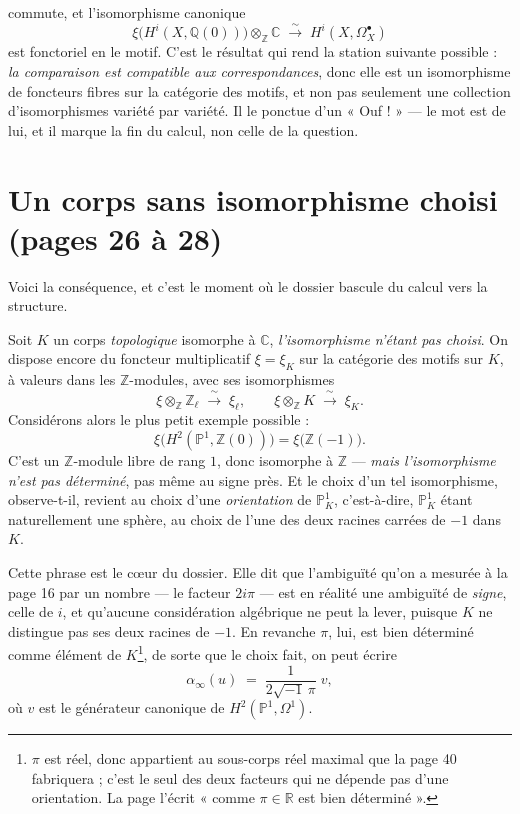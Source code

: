 \documentclass[11pt,a4paper]{article}
\begin{document}

commute, et l'isomorphisme canonique
\[
  \xi\bigl(H^{i}(X, \mathbb{Q}(0))\bigr) \otimes_{\mathbb{Z}} \mathbb{C}
  \;\xrightarrow{\ \sim\ }\;
  H^{i}(X, \Omega^{\bullet}_{X})
\]
est fonctoriel en le motif. C'est le résultat qui rend la station suivante
possible : \emph{la comparaison est compatible aux correspondances}, donc elle
est un isomorphisme de foncteurs fibres sur la catégorie des motifs, et non pas
seulement une collection d'isomorphismes variété par variété. Il le ponctue
d'un « Ouf ! » — le mot est de lui, et il marque la fin du calcul, non celle de
la question.

\section*{Un corps sans isomorphisme choisi (pages 26 à 28)}

Voici la conséquence, et c'est le moment où le dossier bascule du calcul vers la
structure.

Soit $K$ un corps \emph{topologique} isomorphe à $\mathbb{C}$, \emph{l'isomorphisme
n'étant pas choisi}. On dispose encore du foncteur multiplicatif $\xi = \xi_{K}$
sur la catégorie des motifs sur $K$, à valeurs dans les $\mathbb{Z}$-modules,
avec ses isomorphismes
\[
  \xi \otimes_{\mathbb{Z}} \mathbb{Z}_{\ell} \;\xrightarrow{\ \sim\ }\; \xi_{\ell} ,
  \qquad
  \xi \otimes_{\mathbb{Z}} K \;\xrightarrow{\ \sim\ }\; \xi_{K} .
\]
Considérons alors le plus petit exemple possible :
\[
  \xi\bigl(H^{2}(\mathbb{P}^{1}, \mathbb{Z}(0))\bigr) = \xi\bigl(\mathbb{Z}(-1)\bigr) .
\]
C'est un $\mathbb{Z}$-module libre de rang $1$, donc isomorphe à $\mathbb{Z}$ —
\emph{mais l'isomorphisme n'est pas déterminé}, pas même au signe près. Et le
choix d'un tel isomorphisme, observe-t-il, revient au choix d'une
\emph{orientation} de $\mathbb{P}^{1}_{K}$, c'est-à-dire, $\mathbb{P}^{1}_{K}$
étant naturellement une sphère, au choix de l'une des deux racines carrées de
$-1$ dans $K$.

Cette phrase est le cœur du dossier. Elle dit que l'ambiguïté qu'on a mesurée
à la page 16 par un nombre — le facteur $2i\pi$ — est en réalité une ambiguïté
de \emph{signe}, celle de $i$, et qu'aucune considération algébrique ne peut la
lever, puisque $K$ ne distingue pas ses deux racines de $-1$. En revanche $\pi$,
lui, est bien déterminé comme élément de $K$\footnote{$\pi$ est réel, donc
appartient au sous-corps réel maximal que la page 40 fabriquera ; c'est le seul
des deux facteurs qui ne dépende pas d'une orientation. La page l'écrit
« comme $\pi \in \mathbb{R}$ est bien déterminé ».}, de sorte que le choix fait,
on peut écrire
\[
  \alpha_{\infty}(u) \;=\; \frac{1}{2\sqrt{-1}\,\pi}\; v ,
\]
où $v$ est le générateur canonique de $H^{2}(\mathbb{P}^{1}, \Omega^{1})$.
\end{document}
